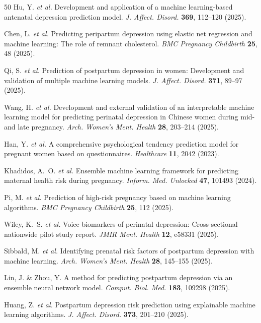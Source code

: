 \documentclass[12pt,a4paper]{article}
\begin{document}
\begin{thebibliography}{50}
 Hu, Y. \textit{et al.} Development and application of a machine learning-based antenatal depression prediction model. \textit{J. Affect. Disord.} \textbf{369}, 112--120 (2025).

 Chen, L. \textit{et al.} Predicting peripartum depression using elastic net regression and machine learning: The role of remnant cholesterol. \textit{BMC Pregnancy Childbirth} \textbf{25}, 48 (2025).

 Qi, S. \textit{et al.} Prediction of postpartum depression in women: Development and validation of multiple machine learning models. \textit{J. Affect. Disord.} \textbf{371}, 89--97 (2025).

 Wang, H. \textit{et al.} Development and external validation of an interpretable machine learning model for predicting perinatal depression in Chinese women during mid- and late pregnancy. \textit{Arch. Women's Ment. Health} \textbf{28}, 203--214 (2025).

 Han, Y. \textit{et al.} A comprehensive psychological tendency prediction model for pregnant women based on questionnaires. \textit{Healthcare} \textbf{11}, 2042 (2023).

 Khadidos, A.~O. \textit{et al.} Ensemble machine learning framework for predicting maternal health risk during pregnancy. \textit{Inform. Med. Unlocked} \textbf{47}, 101493 (2024).

 Pi, M. \textit{et al.} Prediction of high-risk pregnancy based on machine learning algorithms. \textit{BMC Pregnancy Childbirth} \textbf{25}, 112 (2025).

 Wiley, K.~S. \textit{et al.} Voice biomarkers of perinatal depression: Cross-sectional nationwide pilot study report. \textit{JMIR Ment. Health} \textbf{12}, e58331 (2025).

 Sibbald, M. \textit{et al.} Identifying prenatal risk factors of postpartum depression with machine learning. \textit{Arch. Women's Ment. Health} \textbf{28}, 145--155 (2025).

 Lin, J. \& Zhou, Y. A method for predicting postpartum depression via an ensemble neural network model. \textit{Comput. Biol. Med.} \textbf{183}, 109298 (2025).

 Huang, Z. \textit{et al.} Postpartum depression risk prediction using explainable machine learning algorithms. \textit{J. Affect. Disord.} \textbf{373}, 201--210 (2025).


\end{thebibliography}
\end{document}
